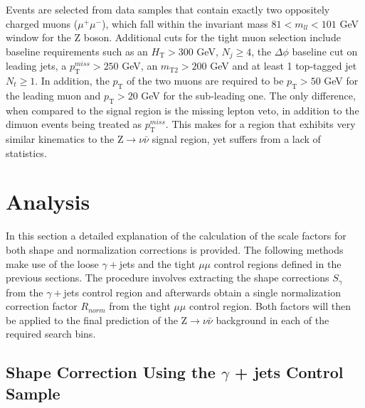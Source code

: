 Events are selected from data samples that contain exactly two oppositely charged muons ($\mu^{+}\mu^{-}$), which fall within the invariant mass $81 < m_{ll} < 101$ GeV window for the Z boson. Additional cuts for the tight muon selection include baseline requirements such as an $H_\text{T} > 300$ GeV, $N_j \geq 4$, the $\Delta\phi$ baseline cut on leading jets, a $p_\text{T}^{miss} > 250$ GeV, an $m_\text{T2} > 200$ GeV and at least 1 top-tagged jet $N_t \geq 1$. In addition, the $p_\text{T}$ of the two muons are required to be $p_\text{T} > 50$ GeV for the leading muon and $p_\text{T} > 20$ GeV for the sub-leading one. The only difference, when compared to the signal region is the missing lepton veto, in addition to the dimuon events being treated as $p_\text{T}^{miss}$. This makes for a region that exhibits very similar kinematics to the Z$\rightarrow\nu\bar{\nu}$ signal region, yet suffers from a lack of statistics.

\section{Analysis}

In this section a detailed explanation of the calculation of the scale factors for both shape and normalization corrections is provided. The following methods make use of the loose $\gamma+$jets and the tight $\mu\mu$ control regions defined in the previous sections. The procedure involves extracting the shape corrections $S_\gamma$ from the $\gamma+$jets control region and afterwards obtain a single normalization correction factor $R_{norm}$ from the tight $\mu\mu$ control region. Both factors will then be applied to the final prediction of the Z$\rightarrow\nu\bar{\nu}$ background in each of the required search bins. 

\subsection{Shape Correction Using the $\gamma$ + jets Control Sample}

